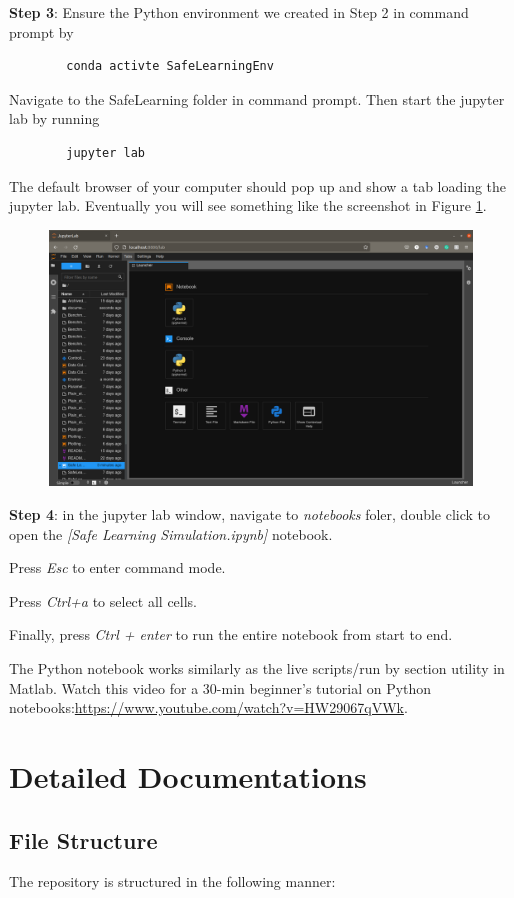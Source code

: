 \documentclass{article}
\theoremstyle{definition}
\theoremstyle{remark}
\begin{document}
	\textbf{Step 3}: Ensure the Python environment we created in Step 2 in command prompt by 
	\begin{verbatim}
		conda activte SafeLearningEnv
	\end{verbatim}
	Navigate to the SafeLearning folder in command prompt. Then start the jupyter lab by running
	\begin{verbatim}
		jupyter lab
	\end{verbatim}
	The default browser of your computer should pop up and show a tab loading the jupyter lab. Eventually you will see something like the screenshot in Figure \ref{fig:jupyter}.
	\begin{figure}[h]
		\centering
		\includegraphics[width=0.8\linewidth]{jupyter}
		\caption{}
		\label{fig:jupyter}
	\end{figure}
	
	\textbf{Step 4}: in the jupyter lab window, navigate to \textit{notebooks} foler, double click to open the \textit{[Safe Learning Simulation.ipynb]} notebook. 
	
	Press \textit{Esc} to enter command mode. 
	
	Press \textit{Ctrl+a} to select all cells.
	
	Finally, press \textit{Ctrl + enter} to run the entire notebook from start to end.
	
	The Python notebook works similarly as the live scripts/run by section utility in Matlab. Watch this video for a 30-min beginner's tutorial on Python notebooks:\url{https://www.youtube.com/watch?v=HW29067qVWk}.
	
	\section{Detailed Documentations}\label{sec:details}
	\subsection{File Structure}
	The repository is structured in the following manner:
	
\end{document}
